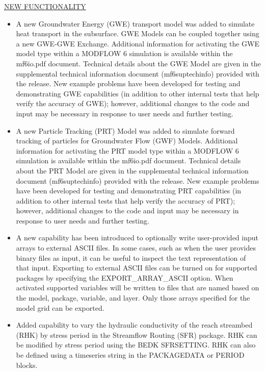	
	\item \currentmodflowversion
	
	\underline{NEW FUNCTIONALITY}
	\begin{itemize}
		\item A new Groundwater Energy (GWE) transport model was added to simulate heat transport in the subsurface.  GWE Models can be coupled together using a new GWE-GWE Exchange.  Additional information for activating the GWE model type within a MODFLOW 6 simulation is available within the mf6io.pdf document.  Technical details about the GWE Model are given in the supplemental technical information document (mf6suptechinfo) provided with the release.  New example problems have been developed for testing and demonstrating GWE capabilities (in addition to other internal tests that help verify the accuracy of GWE); however, additional changes to the code and input may be necessary in response to user needs and further testing.
		\item A new Particle Tracking (PRT) Model was added to simulate forward tracking of particles for Groundwater Flow (GWF) Models.  Additional information for activating the PRT model type within a MODFLOW 6 simulation is available within the mf6io.pdf document.  Technical details about the PRT Model are given in the supplemental technical information document (mf6suptechinfo) provided with the release. New example problems have been developed for testing and demonstrating PRT capabilities (in addition to other internal tests that help verify the accuracy of PRT); however, additional changes to the code and input may be necessary in response to user needs and further testing.
		\item A new capability has been introduced to optionally write user-provided input arrays to external ASCII files.  In some cases, such as when the user provides binary files as input, it can be useful to inspect the text representation of that input.  Exporting to external ASCII files can be turned on for supported packages by specifying the EXPORT\_ARRAY\_ASCII option.  When activated supported variables will be written to files that are named based on the model, package, variable, and layer.  Only those arrays specified for the model grid can be exported.
		\item Added capability to vary the hydraulic conductivity of the reach streambed (RHK) by stress period in the Streamflow Routing (SFR) package. RHK can be modified by stress period using the BEDK SFRSETTING. RHK can also be defined using a timeseries string in the PACKAGEDATA or PERIOD blocks.

\end{itemize}
